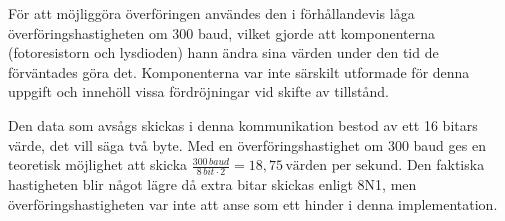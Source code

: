             För att möjliggöra överföringen användes den i förhållandevis låga överföringshastigheten om 300 baud, vilket gjorde att komponenterna (fotoresistorn och lysdioden) hann ändra sina värden under den tid de förväntades göra det. Komponenterna var inte särskilt utformade för denna uppgift och innehöll vissa fördröjningar vid skifte av tillstånd. \bigskip

            Den data som avsågs skickas i denna kommunikation bestod av ett 16 bitars värde, det vill säga två byte. Med en överföringshastighet om 300 baud ges en teoretisk möjlighet att skicka $\frac{300 \,\textit{baud}}{8 \, bit \cdot 2} = 18,75 \, \text{värden per sekund}$. Den faktiska hastigheten blir något lägre då extra bitar skickas enligt 8N1, men överföringshastigheten var inte att anse som ett hinder i denna implementation.\bigskip

